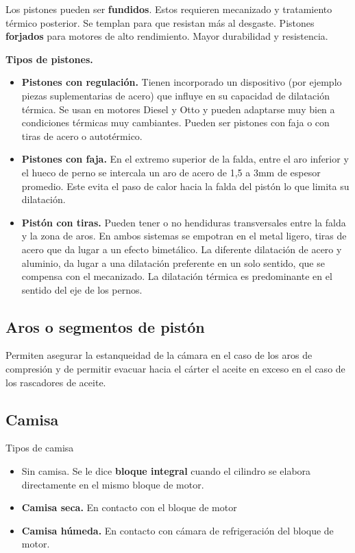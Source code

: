 Los pistones pueden ser \textbf{fundidos}. Estos requieren mecanizado y tratamiento térmico posterior. Se templan para que resistan más al desgaste. 
Pistones \textbf{forjados} para motores de alto rendimiento. Mayor durabilidad y resistencia.

\textbf{Tipos de pistones.}
\begin{itemize}
    \item \textbf{Pistones con regulación.} Tienen incorporado un dispositivo (por ejemplo piezas suplementarias de acero) que influye en su capacidad de dilatación térmica. Se usan en motores Diesel y Otto y pueden adaptarse muy bien a condiciones térmicas muy cambiantes. Pueden ser pistones con faja o con tiras de acero o autotérmico.

\item \textbf{Pistones con faja.} En el extremo superior de la falda, entre el aro inferior y el hueco de perno se intercala un aro de acero de 1,5 a 3mm de espesor promedio. Este evita el paso de calor hacia la falda del pistón lo que limita su dilatación.

\item \textbf{Pistón con tiras.} Pueden tener o no hendiduras transversales entre la falda y la zona de aros. En ambos sistemas se empotran en el metal ligero, tiras de acero que da lugar a un efecto bimetálico. La diferente dilatación de acero y aluminio, da lugar a una dilatación preferente en un solo sentido, que se compensa con el mecanizado. La dilatación térmica es predominante en el sentido del eje de los pernos.

\end{itemize}

\subsection{Aros o segmentos de pistón}
Permiten asegurar la estanqueidad de la cámara en el caso de los aros de compresión y de permitir evacuar hacia el cárter el aceite en exceso en el caso de los rascadores de aceite.




\subsection{Camisa}
Tipos de camisa
\begin{itemize}
    \item Sin camisa. Se le dice \textbf{bloque integral} cuando el cilindro se elabora directamente en el mismo bloque de motor.
    \item \textbf{Camisa seca.} En contacto con el bloque de motor
    \item \textbf{Camisa húmeda.} En contacto con cámara de refrigeración del bloque de motor.
\end{itemize}


